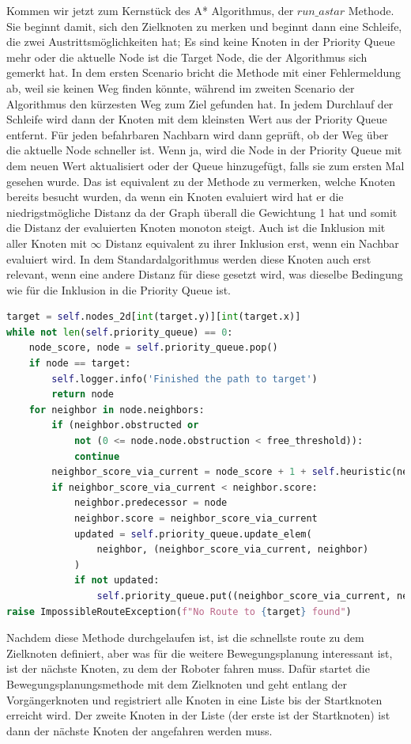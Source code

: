 Kommen wir jetzt zum Kernstück des A* Algorithmus, der $run\_astar$ Methode.
Sie beginnt damit, sich den Zielknoten zu merken und beginnt dann eine Schleife, die zwei Austrittsmöglichkeiten hat;
Es sind keine Knoten in der Priority Queue mehr oder die aktuelle Node ist die Target Node, die der Algorithmus sich gemerkt
hat.
In dem ersten Scenario bricht die Methode mit einer Fehlermeldung ab, weil sie keinen Weg finden könnte, während im
zweiten Scenario der Algorithmus den kürzesten Weg zum Ziel gefunden hat.
In jedem Durchlauf der Schleife wird dann der Knoten mit dem kleinsten Wert aus der Priority Queue entfernt.
Für jeden befahrbaren Nachbarn wird dann geprüft, ob der Weg über die aktuelle Node schneller ist.
Wenn ja, wird die Node in der Priority Queue mit dem neuen Wert aktualisiert oder der Queue hinzugefügt, falls sie
zum ersten Mal gesehen wurde.
Das ist equivalent zu der Methode zu vermerken, welche Knoten bereits besucht wurden, da wenn ein Knoten evaluiert wird
hat er die niedrigstmögliche Distanz da der Graph überall die Gewichtung 1 hat und somit die Distanz der evaluierten
Knoten monoton steigt.
Auch ist die Inklusion mit aller Knoten mit $\infty$ Distanz equivalent zu ihrer Inklusion erst, wenn ein Nachbar evaluiert wird.
In dem Standardalgorithmus werden diese Knoten auch erst relevant, wenn eine andere Distanz für diese gesetzt wird, was
dieselbe Bedingung wie für die Inklusion in die Priority Queue ist.
\begin{lstlisting}[language=python,label={lst:run_astar}]
target = self.nodes_2d[int(target.y)][int(target.x)]
while not len(self.priority_queue) == 0:
    node_score, node = self.priority_queue.pop()
    if node == target:
        self.logger.info('Finished the path to target')
        return node
    for neighbor in node.neighbors:
        if (neighbor.obstructed or
            not (0 <= node.node.obstruction < free_threshold)):
            continue
        neighbor_score_via_current = node_score + 1 + self.heuristic(neighbor, target)
        if neighbor_score_via_current < neighbor.score:
            neighbor.predecessor = node
            neighbor.score = neighbor_score_via_current
            updated = self.priority_queue.update_elem(
                neighbor, (neighbor_score_via_current, neighbor)
            )
            if not updated:
                self.priority_queue.put((neighbor_score_via_current, neighbor))
raise ImpossibleRouteException(f"No Route to {target} found")
\end{lstlisting}

Nachdem diese Methode durchgelaufen ist, ist die schnellste route zu dem Zielknoten definiert, aber was für die weitere
Bewegungsplanung interessant ist, ist der nächste Knoten, zu dem der Roboter fahren muss.
Dafür startet die Bewegungsplanungsmethode mit dem Zielknoten und geht entlang der Vorgängerknoten und registriert alle
Knoten in eine Liste bis der Startknoten erreicht wird.
Der zweite Knoten in der Liste (der erste ist der Startknoten) ist dann der nächste Knoten der angefahren werden muss.

